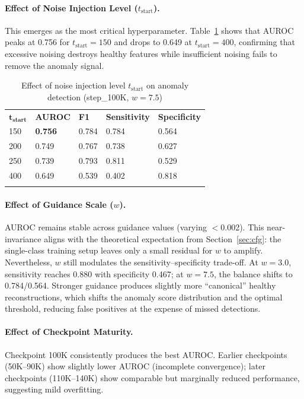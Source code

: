 \documentclass[graybox]{svmult}
\begin{document}
\paragraph{Effect of Noise Injection Level ($t_{\text{start}}$).} This emerges as the most critical hyperparameter. Table~\ref{tab:tstart_effect} shows that AUROC peaks at 0.756 for $t_{\text{start}} = 150$ and drops to 0.649 at $t_{\text{start}} = 400$, confirming that excessive noising destroys healthy features while insufficient noising fails to remove the anomaly signal.

\begin{table}[!t]
\caption{Effect of noise injection level $t_{\text{start}}$ on anomaly detection (step\_100K, $w = 7.5$)}
\label{tab:tstart_effect}
\begin{tabular}{p{1.5cm}p{1.5cm}p{1.5cm}p{2cm}p{2cm}}
\hline\noalign{\smallskip}
$\boldsymbol{t_{\textbf{start}}}$ & \textbf{AUROC} & \textbf{F1} & \textbf{Sensitivity} & \textbf{Specificity} \\
\noalign{\smallskip}\svhline\noalign{\smallskip}
150  & \textbf{0.756} & 0.784 & 0.784 & 0.564 \\
200  & 0.749 & 0.767 & 0.738 & 0.627 \\
250  & 0.739 & 0.793 & 0.811 & 0.529 \\
400  & 0.649 & 0.539 & 0.402 & 0.818 \\
\noalign{\smallskip}\hline\noalign{\smallskip}
\end{tabular}
\end{table}

\paragraph{Effect of Guidance Scale ($w$).} AUROC remains stable across guidance values (varying $<$0.002). This near-invariance aligns with the theoretical expectation from Section~\ref{sec:cfg}: the single-class training setup leaves only a small residual for $w$ to amplify. Nevertheless, $w$ still modulates the sensitivity--specificity trade-off. At $w = 3.0$, sensitivity reaches 0.880 with specificity 0.467; at $w = 7.5$, the balance shifts to 0.784/0.564. Stronger guidance produces slightly more ``canonical'' healthy reconstructions, which shifts the anomaly score distribution and the optimal threshold, reducing false positives at the expense of missed detections.

\paragraph{Effect of Checkpoint Maturity.} Checkpoint 100K consistently produces the best AUROC. Earlier checkpoints (50K--90K) show slightly lower AUROC (incomplete convergence); later checkpoints (110K--140K) show comparable but marginally reduced performance, suggesting mild overfitting.
\end{document}
